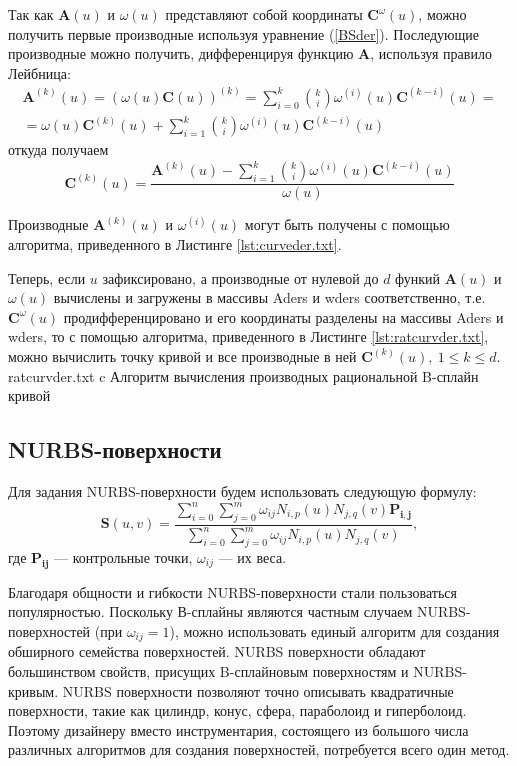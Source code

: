 \documentclass{bmstu}
\begin{document}
Так как $\mathbf{A}(u)$ и $\omega(u)$ представляют собой координаты $\mathbf{C}^\omega(u)$, можно получить первые производные используя уравнение (\ref{BSder}). Последующие производные можно получить, дифференцируя функцию $\mathbf{A}$, используя правило Лейбница:
\begin{multline}
    \mathbf{A}^{(k)}(u)=(\omega(u)\mathbf{C}(u))^{(k)}=\sum\limits_{i=0}^k\binom{k}{i}\omega^{(i)}(u)\mathbf{C}^{(k-i)}(u)=\\=\omega(u)\mathbf{C}^{(k)}(u)+\sum\limits_{i=1}^{k}\binom{k}{i}\omega^{(i)}(u)\mathbf{C}^{(k-i)}(u)
\end{multline}
откуда получаем
\begin{equation}
    \mathbf{C}^{(k)}(u) = \frac{\mathbf{A}^{(k)}(u)-\sum\limits_{i=1}^{k}\binom{k}{i}\omega^{(i)}(u)\mathbf{C}^{(k-i)}(u)}{\omega(u)}
\end{equation}

Производные $\mathbf{A}^{(k)}(u)$ и $\omega^{(i)}(u)$ могут быть получены с помощью алгоритма, приведенного в Листинге \ref{lst:curveder.txt}.

Теперь, если $u$ зафиксировано, а производные от нулевой до $d$ функий $\mathbf{A}(u)$ и $\omega(u)$ вычислены и загружены в массивы Aders и wders соответственно, т.е. $\mathbf{C}^\omega(u)$ продифференцировано и его координаты разделены на массивы Aders и wders, то с помощью алгоритма, приведенного в Листинге \ref{lst:ratcurvder.txt}, можно вычислить точку кривой и все производные в ней $\mathbf{C}^{(k)}(u),~ 1 \le k \le d$.
{ratcurvder.txt} %
{c} %
{Алгоритм вычисления производных рациональной B-сплайн кривой} %


\subsection{NURBS-поверхности}

Для задания NURBS-поверхности будем использовать следующую формулу:
\begin{equation}
    \mathbf{S}(u, v) = \frac{\sum\limits_{i=0}^n\sum\limits_{j=0}^m\omega_{ij}N_{i,p}(u)N_{j,q}(v)\mathbf{P_{i,j}}}{\sum\limits_{i=0}^n\sum\limits_{j=0}^m\omega_{ij}N_{i,p}(u)N_{j,q}(v)},
\end{equation}
где $\mathbf{P_{ij}}$ --- контрольные точки, $\omega_{ij}$ --- их веса.

Благодаря общности и гибкости NURBS-поверхности стали пользоваться
популярностью. Поскольку В-сплайны являются частным случаем
NURBS-поверхностей (при $\omega_{ij} = 1$), можно использовать единый алгоритм для создания обширного семейства поверхностей. NURBS
поверхности обладают большинством свойств, присущих B-сплайновым
поверхностям и NURBS-кривым. NURBS поверхности позволяют точно
описывать квадратичные поверхности, такие как цилиндр, конус, сфера,
параболоид и гиперболоид. Поэтому дизайнеру вместо инструментария,
состоящего из большого числа различных алгоритмов для создания
поверхностей, потребуется всего один метод.
\end{document}
